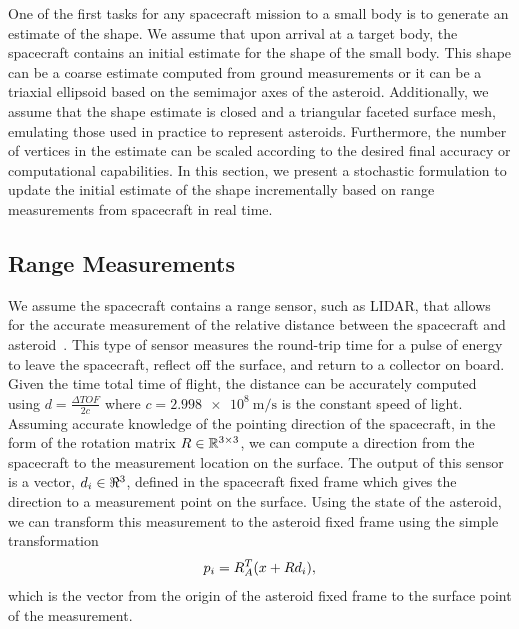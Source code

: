 \documentclass[journal]{new-aiaa}
\begin{document}
One of the first tasks for any spacecraft mission to a small body is to generate an estimate of the shape.
We assume that upon arrival at a target body, the spacecraft contains an initial estimate for the shape of the small body.
This shape can be a coarse estimate computed from ground measurements or it can be a triaxial ellipsoid based on the semimajor axes of the asteroid.
Additionally, we assume that the shape estimate is closed and a triangular faceted surface mesh, emulating those used in practice to represent asteroids.
Furthermore, the number of vertices in the estimate can be scaled according to the desired final accuracy or computational capabilities.
In this section, we present a stochastic formulation to update the initial estimate of the shape incrementally based on range measurements from spacecraft in real time. 

\subsection{Range Measurements}

We assume the spacecraft contains a range sensor, such as LIDAR, that allows for the accurate measurement of the relative distance between the spacecraft and asteroid~\cite{zuber1997,zuber2000}.
This type of sensor measures the round-trip time for a pulse of energy to leave the spacecraft, reflect off the surface, and return to a collector on board.
Given the time total time of flight, the distance can be accurately computed using \( d = \frac{\Delta TOF}{2 c} \) where \( c = \SI{2.998e8}{\meter\per\second}\) is the constant speed of light.
Assuming accurate knowledge of the pointing direction of the spacecraft, in the form of the rotation matrix \( R \in \mathbb{R}^{3 \times 3 } \), we can compute a direction from the spacecraft to the measurement location on the surface.
The output of this sensor is a vector, \( d_i\in\Re^3 \), defined in the spacecraft fixed frame which gives the direction to a measurement point on the surface. 
Using the state of the asteroid, we can transform this measurement to the asteroid fixed frame using the simple transformation
\begin{align*}
    p_i = R_A^T (x+R d_i), 
\end{align*}
which is the vector from the origin of the asteroid fixed frame to the surface point of the measurement.
\end{document}
